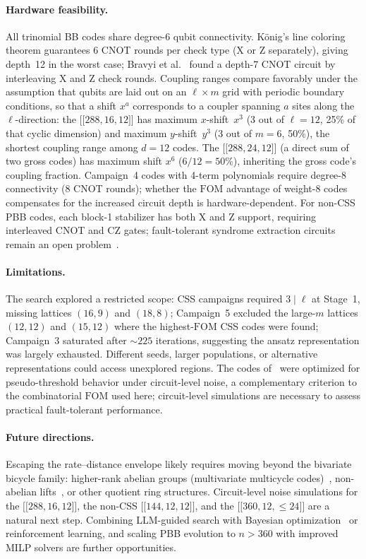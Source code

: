 \documentclass[aps,prxquantum,twocolumn,superscriptaddress,nofootinbib]{revtex4-2}
\newcommand{\dblbrk}[1]{\ensuremath{\lbrack\!\lbrack #1 \rbrack\!\rbrack}}
\newcommand{\code}[1]{\dblbrk{#1}}
\newcommand{\FOM}{\ensuremath{\mathrm{FOM}}}
\begin{document}
\paragraph{Hardware feasibility.}
All trinomial BB codes share degree-6 qubit connectivity. K\"onig's line coloring theorem guarantees 6 CNOT rounds per check type (X or Z separately), giving depth~12 in the worst case; Bravyi et al.~\cite{bravyi2024high} found a depth-7 CNOT circuit by interleaving X and Z check rounds.
Coupling ranges compare favorably under the assumption that qubits are laid out on an $\ell \times m$ grid with periodic boundary conditions, so that a shift $x^a$ corresponds to a coupler spanning $a$ sites along the $\ell$-direction: the $\code{288,16,12}$ has maximum $x$-shift~$x^3$ (3 out of $\ell = 12$, 25\% of that cyclic dimension) and maximum $y$-shift~$y^3$ (3 out of $m = 6$, 50\%), the shortest coupling range among $d = 12$ codes.
The $\code{288,24,12}$ (a direct sum of two gross codes) has maximum shift $x^6$ ($6/12 = 50\%$), inheriting the gross code's coupling fraction.
Campaign~4 codes with 4-term polynomials require degree-8 connectivity (8 CNOT rounds); whether the $\FOM$ advantage of weight-8 codes compensates for the increased circuit depth is hardware-dependent.
For non-CSS PBB codes, each block-1 stabilizer has both X and Z support, requiring interleaved CNOT and CZ gates; fault-tolerant syndrome extraction circuits remain an open problem~\cite{khesin2026mirror}.

\paragraph{Limitations.}
The search explored a restricted scope: CSS campaigns required $3 \mid \ell$ at Stage~1, missing lattices $(16,9)$ and $(18,8)$; Campaign~5 excluded the large-$m$ lattices $(12,12)$ and $(15,12)$ where the highest-$\FOM$ CSS codes were found; Campaign~3 saturated after ${\sim}225$ iterations, suggesting the ansatz representation was largely exhausted.
Different seeds, larger populations, or alternative representations could access unexplored regions.
The codes of~\cite{bravyi2024high} were optimized for pseudo-threshold behavior under circuit-level noise, a complementary criterion to the combinatorial $\FOM$ used here; circuit-level simulations are necessary to assess practical fault-tolerant performance.

\paragraph{Future directions.}
Escaping the rate--distance envelope likely requires moving beyond the bivariate bicycle family: higher-rank abelian groups (multivariate multicycle codes)~\cite{mian2026multivariate}, non-abelian lifts~\cite{breuckmann2021balanced}, or other quotient ring structures.
Circuit-level noise simulations for the $\code{288,16,12}$, the non-CSS $\code{144,12,12}$, and the $\code{360,12,{\leq}24}$ are a natural next step.
Combining LLM-guided search with Bayesian optimization~\cite{chengyu2026bayesian} or reinforcement learning, and scaling PBB evolution to $n > 360$ with improved MILP solvers are further opportunities.
\end{document}

